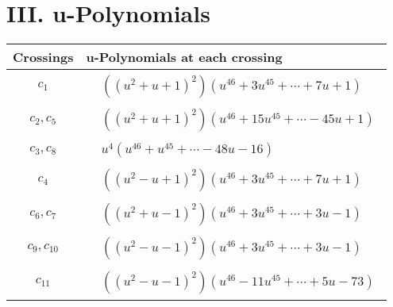 \documentclass[1p]{elsarticle_modified}
\theoremstyle{definition}
\begin{document}
\newpage\renewcommand{\arraystretch}{1}
\centering \section*{ III. u-Polynomials}
\begin{tabular}{m{50pt}|m{274pt}}
Crossings & \hspace{64pt}u-Polynomials at each crossing \\
\hline $$\begin{aligned}c_{1}\end{aligned}$$&$\begin{aligned}
&((u^2+u+1)^2)(u^{46}+3 u^{45}+\cdots+7 u+1)
\end{aligned}$\\
\hline $$\begin{aligned}c_{2},c_{5}\end{aligned}$$&$\begin{aligned}
&((u^2+u+1)^2)(u^{46}+15 u^{45}+\cdots-45 u+1)
\end{aligned}$\\
\hline $$\begin{aligned}c_{3},c_{8}\end{aligned}$$&$\begin{aligned}
&u^4(u^{46}+u^{45}+\cdots-48 u-16)
\end{aligned}$\\
\hline $$\begin{aligned}c_{4}\end{aligned}$$&$\begin{aligned}
&((u^2- u+1)^2)(u^{46}+3 u^{45}+\cdots+7 u+1)
\end{aligned}$\\
\hline $$\begin{aligned}c_{6},c_{7}\end{aligned}$$&$\begin{aligned}
&((u^2+u-1)^2)(u^{46}+3 u^{45}+\cdots+3 u-1)
\end{aligned}$\\
\hline $$\begin{aligned}c_{9},c_{10}\end{aligned}$$&$\begin{aligned}
&((u^2- u-1)^2)(u^{46}+3 u^{45}+\cdots+3 u-1)
\end{aligned}$\\
\hline $$\begin{aligned}c_{11}\end{aligned}$$&$\begin{aligned}
&((u^2- u-1)^2)(u^{46}-11 u^{45}+\cdots+5 u-73)
\end{aligned}$\\
\hline
\end{tabular}\newpage\renewcommand{\arraystretch}{1}
\end{document}
